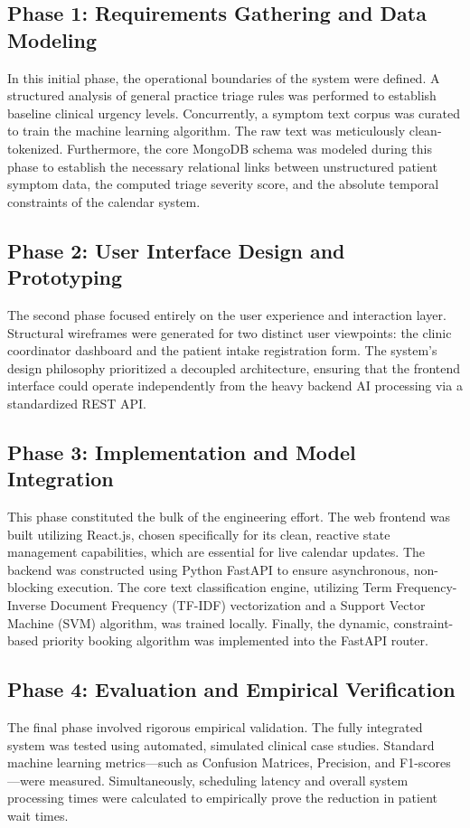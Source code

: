 \documentclass[12pt,a4paper]{report}
\begin{document}
\subsection{Phase 1: Requirements Gathering and Data Modeling}
In this initial phase, the operational boundaries of the system were defined. A structured analysis of general practice triage rules was performed to establish baseline clinical urgency levels. Concurrently, a symptom text corpus was curated to train the machine learning algorithm. The raw text was meticulously clean-tokenized. Furthermore, the core MongoDB schema was modeled during this phase to establish the necessary relational links between unstructured patient symptom data, the computed triage severity score, and the absolute temporal constraints of the calendar system.

\subsection{Phase 2: User Interface Design and Prototyping}
The second phase focused entirely on the user experience and interaction layer. Structural wireframes were generated for two distinct user viewpoints: the clinic coordinator dashboard and the patient intake registration form. The system's design philosophy prioritized a decoupled architecture, ensuring that the frontend interface could operate independently from the heavy backend AI processing via a standardized REST API.

\subsection{Phase 3: Implementation and Model Integration}
This phase constituted the bulk of the engineering effort. The web frontend was built utilizing React.js, chosen specifically for its clean, reactive state management capabilities, which are essential for live calendar updates. The backend was constructed using Python FastAPI to ensure asynchronous, non-blocking execution. The core text classification engine, utilizing Term Frequency-Inverse Document Frequency (TF-IDF) vectorization and a Support Vector Machine (SVM) algorithm, was trained locally. Finally, the dynamic, constraint-based priority booking algorithm was implemented into the FastAPI router.

\subsection{Phase 4: Evaluation and Empirical Verification}
The final phase involved rigorous empirical validation. The fully integrated system was tested using automated, simulated clinical case studies. Standard machine learning metrics—such as Confusion Matrices, Precision, and F1-scores—were measured. Simultaneously, scheduling latency and overall system processing times were calculated to empirically prove the reduction in patient wait times.
\end{document}
